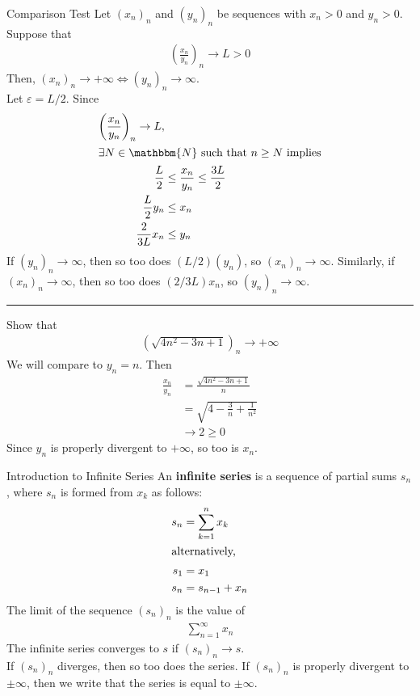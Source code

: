 \documentclass[10pt]{extarticle}
\newcommand{\N}{\mathbbm{N}}
\begin{document}
  \begin{problem}{Comparison Test}
    Let $(x_n)_n$ and $(y_n)_n$ be sequences with $x_n > 0$ and $y_n > 0$. Suppose that 
    \begin{align*}
      \left(\frac{x_n}{y_n}\right)_n \rightarrow L > 0
    \end{align*}
    Then, $(x_n)_n \rightarrow +\infty \Leftrightarrow (y_n)_n \rightarrow \infty$.\\

    Let $\varepsilon = L/2$. Since
    \begin{align*}
      \left(\frac{x_n}{y_n}\right)_n \rightarrow L,\\
      \shortintertext{$\exists N \in\N$ such that $n\geq N$ implies}
      \frac{L}{2} &\leq \frac{x_n}{y_n} \leq \frac{3L}{2}\\
      \frac{L}{2}y_n  &\leq x_n\\
      \frac{2}{3L}x_n &\leq y_n
    \end{align*}
    If $(y_n)_n \rightarrow \infty$, then so too does $(L/2)(y_n)$, so $(x_n)_n\rightarrow\infty$. Similarly, if $(x_n)_n\rightarrow\infty$, then so too does $(2/3L)x_n$, so $(y_n)_n\rightarrow\infty$.\\
    \vspace{4pt}
    \rule{\textwidth}{0.4pt}
    \vspace{4pt}
    Show that
    \begin{align*}
      \left(\sqrt{4n^2 -3n + 1}\right)_n \rightarrow +\infty
    \end{align*}
    We will compare to $y_n = n$. Then
    \begin{align*}
      \frac{x_n}{y_n} &= \frac{\sqrt{4n^2-3n+1}}{n}\\
                      &= \sqrt{4 - \frac{3}{n} + \frac{1}{n^2}}\\
                      &\rightarrow 2 \geq 0
    \end{align*}
    Since $y_n$ is properly divergent to $+\infty$, so too is $x_n$.
  \end{problem}
  \begin{problem}{Introduction to Infinite Series}
    An \textbf{infinite series} is a sequence of partial sums $s_n$, where $s_n$ is formed from $x_k$ as follows:
    \begin{align*}
      s_n &= \sum_{k=1}^{n} x_k\\
      \shortintertext{alternatively,}
      s_1 &= x_1\\
      s_{n} &= s_{n-1} + x_n
    \end{align*}
    The limit of the sequence $(s_n)_n$ is the value of
    \begin{align*}
      \sum_{n=1}^{\infty}x_n
    \end{align*}
    The infinite series converges to $s$ if $(s_n)_n \rightarrow s$.\\

    If $(s_n)_n$ diverges, then so too does the series. If $(s_n)_n$ is properly divergent to $\pm \infty$, then we write that the series is equal to $\pm\infty$.
  \end{problem}
\end{document}
